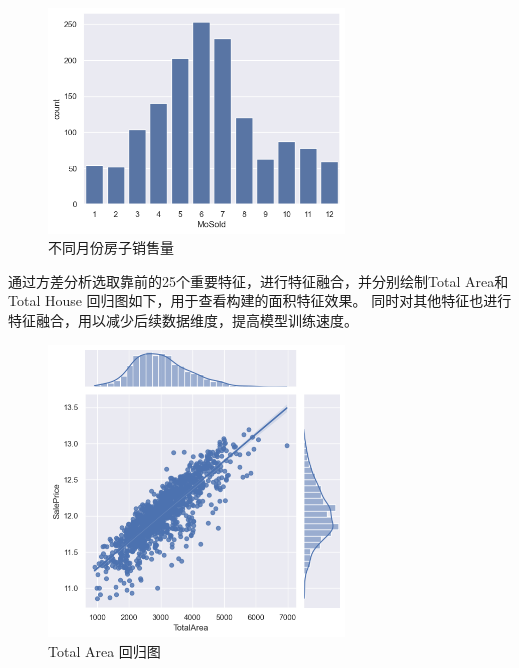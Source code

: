 \documentclass[12pt]{ctexart}
\begin{document}
\begin{figure}[H]
    \centering
    \includegraphics[width=0.7\textwidth]{image/output4-6.png}
    \caption{不同月份房子销售量}
\end{figure}

通过方差分析选取靠前的25个重要特征，进行特征融合，并分别绘制Total Area和Total House 回归图如下，用于查看构建的面积特征效果。
同时对其他特征也进行特征融合，用以减少后续数据维度，提高模型训练速度。

\begin{figure}[H]
    \centering
    \includegraphics[width=0.7\textwidth]{image/output4-8.png}
    \caption{Total Area 回归图}
\end{figure}    
\end{document}
